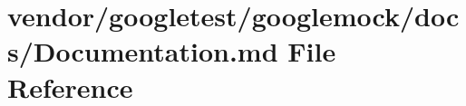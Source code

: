 \hypertarget{googlemock_2docs_2_documentation_8md}{}\section{vendor/googletest/googlemock/docs/\+Documentation.md File Reference}
\label{googlemock_2docs_2_documentation_8md}
